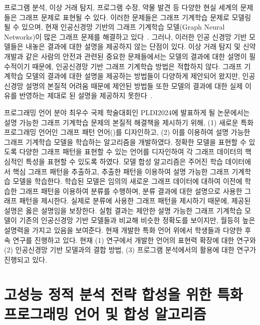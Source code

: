 \documentclass[11pt]{article}
\begin{document}
\begin{spacing}{1.145}
프로그램 분석, 이상 거래 탐지, 프로그램 수정, 약물 발견 등 다양한 현실 세계의 문제들은 그래프 문제로 표현될 수 있다.
%
이러한 문제들은 그래프 기계학습 문제로 모델링될 수 있으며, 현재 인공신경망 기반의 그래프 기계학습 모델(Graph Neural Networks)이 많은 그래프 문제를 해결하고 있다~\cite{wu2019comprehensive}.
%
그러나, 이러한 인공 신경망 기반 모델들은 내놓은 결과에 대한 설명을 제공하지 않는 단점이 있다.
%
이상 거래 탐지 및 신약 개발과 같은 사람의 안전과 관련된 중요한 문제들에서는 모델의 결과에 대한 설명이 필수적이기 때문에, 인공신경망 기반 그래프 기계학습 방법은 적합하지 않다.
%
그래프 기계학습 모델의 결과에 대한 설명을 제공하는 방법들이 다양하게 제안되어 왔지만, 인공신경망 설명의 본질적 어려움 때문에 제안된 방법들 또한 모델의 결과에 대한 실제 이유를 반영하는 제대로 된 설명을 제공하지 못한다~\cite{yuan20survey}.

프로그래밍 언어 분야 최우수 국제 학술대회인 PLDI2024에 발표하게 될 논문에서는 설명 가능한 그래프 기계학습 문제의 본질적 해결책을 제시하기 위해, (1) 새로운 특화 프로그래밍 언어인 그래프 패턴 언어(\GDL)를 디자인하고, (2) 이를 이용하여 설명 가능한 그래프 기계학습 모델을 학습하는 알고리즘을 개발하였다.
%
정확한 모델을 표현할 수 있도록 다양한 그래프 패턴을 표현할 수 있는 언어를 디자인하여 각 그래프 데이터의 핵심적인 특성을 표현할 수 있도록 하였다.
%
모델 합성 알고리즘은 주어진 학습 데이터에서 핵심 그래프 패턴을 추출하고, 추출한 패턴을 이용하여 설명 가능한 그래프 기계학습 모델을 학습한다.
%
학습된 모델은 임의의 새로운 그래프 데이터에 대하여 이전에 학습한 그래프 패턴을 이용하여 분류를 수행하며, 분류 결과에 대한 설명으로 사용한 그래프 패턴을 제시한다.
%
실제로 분류에 사용한 그래프 패턴을 제시하기 때문에, 제공된 설명은 옳은 설명임을 보장한다.
%
실험 결과는 제안한 설명 가능한 그래프 기계학습 모델이 기존의 인공신경망 기반 모델들과 비교해 비슷한 정확도를 보이지만, 월등히 높은 설명력을 가지고 있음을 보여준다.
%
현재 개발한 특화 언어 위에서 학생들과 다양한 후속 연구를 진행하고 있다.
%
현재 (1) 연구에서 개발한 언어의 표현력 확장에 대한 연구와 (2) 인공신경망 기반 모델과의 결합 방법, (3) 프로그램 분석에서의 활용에 대한 연구가 진행되고 있다.





\section{고성능 정적 분석 전략 합성을 위한 특화 프로그래밍 언어 및 합성 알고리즘}


\end{spacing}
\end{document}

